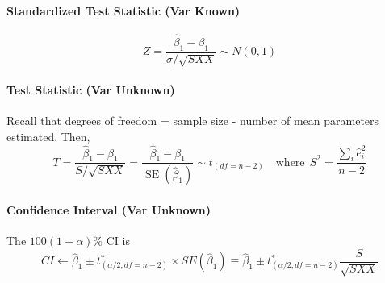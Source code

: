 \documentclass[11pt]{article}
\begin{document}
\paragraph{Standardized Test Statistic (Var Known)}
\begin{equation*}
    Z=\frac{\hat{\beta}_{1}-\beta_{1}}{\sigma / \sqrt{S X X}} \sim N(0,1)
\end{equation*}
\paragraph{Test Statistic (Var Unknown)}
Recall that degrees of freedom = sample size - number of mean parameters estimated. Then,
\begin{equation*}
    T=\frac{\hat{\beta}_{1}-\beta_{1}}{S / \sqrt{S X X}}=\frac{\hat{\beta}_{1}-\beta_{1}}{\operatorname{SE}\left(\hat{\beta}_{1}\right)} \sim t_{(df=n-2)} \quad \text{where}~~ S^2 = \frac{\sum_i \hat{e}_i^2}{n-2} 
\end{equation*}
\paragraph{Confidence Interval (Var Unknown)}
The $100(1- \alpha)\%$ CI is
\begin{equation*}
    CI \gets \hat{\beta}_1 \pm t^\ast_{(\alpha/2, df=n-2)} \times SE(\hat{\beta}_1) \equiv \hat{\beta}_1 \pm t^\ast_{(\alpha/2, df=n-2)} \frac{S}{\sqrt{S X X}}
\end{equation*}
\end{document}
